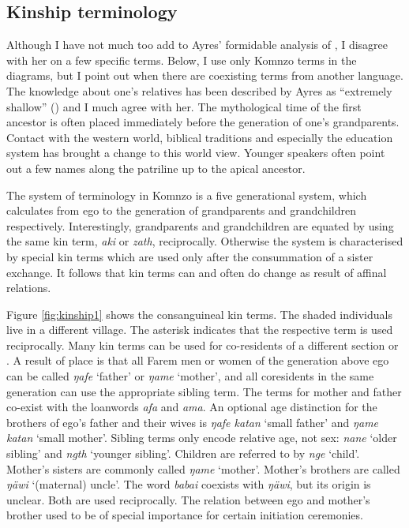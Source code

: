 \subsection{Kinship terminology}\label{kinterms}

Although I have not much too add to Ayres' formidable analysis of , I disagree with her on a few specific terms. Below, I use only Komnzo terms in the  diagrams, but I point out when there are coexisting terms from another language. The knowledge about one's relatives has been described by Ayres as ``extremely shallow'' (\citeyear[217]{Ayres:ws}) and I much agree with her. The mythological time of the first ancestor is often placed immediately before the generation of one's grandparents. Contact with the western world, biblical traditions and especially the education system has brought a change to this world view. Younger speakers often point out a few names along the patriline up to the apical ancestor.%

The system of  terminology in Komnzo is a five generational system, which calculates from ego to the generation of grandparents and grandchildren respectively. Interestingly, grandparents and grandchildren are equated by using the same kin term, \emph{aki} or \emph{zath}, reciprocally. Otherwise the system is characterised by special kin terms which are used only after the consummation of a sister exchange. It follows that kin terms can and often do change as result of affinal relations.%

Figure \ref{fig:kinship1} shows the consanguineal kin terms. The shaded individuals live in a different village. The asterisk indicates that the respective term is used reciprocally. Many kin terms can be used for co-residents of a different section or . A result of place  is that all Farem men or women of the generation above ego can be called \emph{ŋafe} `father' or \emph{ŋame} `mother', and all coresidents in the same generation can use the appropriate sibling term. The terms for mother and father co-exist with the  loanwords \emph{afa} and \emph{ama}. An optional age distinction for the brothers of ego's father and their wives is \emph{ŋafe katan} `small father' and \emph{ŋame katan} `small mother'. Sibling terms only encode relative age, not sex: \emph{nane} `older sibling' and \emph{ngth} `younger sibling'. Children are referred to by \emph{nge} `child'. Mother's sisters are commonly called \emph{ŋame} `mother'. Mother's brothers are called \emph{ŋäwi} `(maternal) uncle'. The word \emph{babai} coexists with \emph{ŋäwi}, but its origin is unclear. Both are used reciprocally. The relation between ego and mother's brother used to be of special importance for certain initiation ceremonies.

